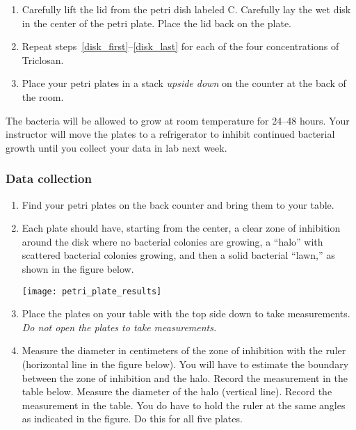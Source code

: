 \documentclass[12pt]{exam}
\begin{document}
\begin{questions}
\begin{enumerate}
		\item \label{disk_last} Carefully lift the lid from the petri dish labeled C. Carefully lay the wet disk in the center of the petri plate. Place the lid back on the plate.


		\item Repeat steps~\ref{disk_first}–\ref{disk_last} for each of the four concentrations of Triclosan.
		
		\item Place your petri plates in a stack \emph{upside down} on the counter at the back of the room.
		
	\end{enumerate}

The bacteria will be allowed to grow at room temperature for 24–48 hours. Your instructor will move the plates to a refrigerator to inhibit continued bacterial growth until you collect your data in lab next week.

\subsubsection*{Data collection}

\begin{enumerate}

	\item Find your petri plates on the back counter and bring them to your table.
	
	\item Each plate should have, starting from the center, a clear zone of inhibition around the disk where no bacterial colonies are growing, a “halo” with scattered bacterial colonies growing, and then a solid bacterial “lawn,” as shown in the figure below.
	
		{\centering\texttt{[image: petri\_plate\_results]}\par
		}

	\item Place the plates on your table with the top side down to take measurements. \emph{Do not open the plates to take measurements.}
	
	\item Measure the diameter in centimeters of the zone of inhibition with the ruler (horizontal line in the figure below). You will have to estimate the boundary between the zone of inhibition and the halo. Record the measurement in the table below. Measure the diameter of the halo (vertical line). Record the measurement in the table. You do have to hold the ruler at the same angles as indicated in the figure. Do this for all five plates.


\end{enumerate}
\end{questions}
\end{document}
